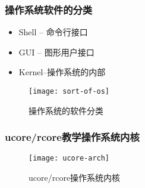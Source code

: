 %
%
%
%

\begin{frame}[plain]
	\frametitle{操作系统软件的分类}
		\begin{itemize}
		\item Shell -- 命令行接口
		\item GUI -- 图形用户接口
		\item Kernel--操作系统的内部
	\end{itemize}
	\begin{figure}
		\centering
		\texttt{[image: sort-of-os]}
		\caption{操作系统的软件分类}
	\end{figure}
\end{frame}

\begin{frame}[plain]
	\frametitle{ucore/rcore教学操作系统内核}
	\begin{figure}
		\centering
		\texttt{[image: ucore-arch]}
		\caption{ucore/rcore操作系统内核}
	\end{figure}
\end{frame}



